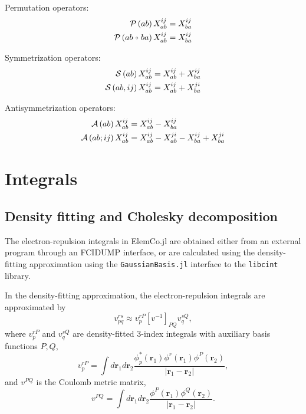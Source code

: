 \documentclass[a4paper,12pt,oneside]{book}
\newcommand{\veryshortarrow}[1][3pt]{\mathrel{%
   \hbox{\rule[\dimexpr\fontdimen22\textfont2-.2pt\relax]{#1}{.4pt}}%
   \mkern-4mu\hbox{\usefont{U}{lasy}{m}{n}\symbol{41}}}}
\newcommand{\vect}{\mathbf}
\newcommand{\perm}[1]{{\cal P}\left(#1\right)}
\newcommand{\Perm}[2]{{\cal P}\left({#1}\veryshortarrow {#2}\right)}
\newcommand{\sop}[1]{{\cal S}\left(#1\right)}
\newcommand{\Sop}[2]{{\cal S}\left(#1,#2\right)}
\newcommand{\asop}[1]{{\cal A}\left(#1\right)}
\newcommand{\ASop}[2]{{\cal A}\left(#1;#2\right)}
\newcommand{\ElemCojl}{\textsf{ElemCo.jl} }
\begin{document}
Permutation operators:
\begin{equation}
\begin{aligned}
\perm{ab} X^{ij}_{ab} &= X^{ij}_{ba} \\
\Perm{ab}{ba} X^{ij}_{ab} &= X^{ij}_{ba} \\
\end{aligned}
\end{equation}

Symmetrization operators:
\begin{equation}
\begin{aligned}
\sop{ab} X^{ij}_{ab} &= X^{ij}_{ab} + X^{ij}_{ba}\\
\Sop{ab}{ij} X^{ij}_{ab} &= X^{ij}_{ab} + X^{ji}_{ba}\\
\end{aligned}
\end{equation}

Antisymmetrization operators:
\begin{equation}
\begin{aligned}
\asop{ab} X^{ij}_{ab} &= X^{ij}_{ab} - X^{ij}_{ba}\\
\ASop{ab}{ij} X^{ij}_{ab} &= X^{ij}_{ab} - X^{ji}_{ab} - X^{ij}_{ba} + X^{ji}_{ba}\\
\end{aligned}
\end{equation}


\chapter{Integrals}
\section{Density fitting and Cholesky decomposition}
\label{sec:df}
The electron-repulsion integrals in \ElemCojl are obtained either from an external program 
through an FCIDUMP \cite{knowlesDeterminant1989} interface, 
or are calculated using the density-fitting approximation using the \texttt{GaussianBasis.jl} 
interface\cite{aroeiraFermi2022} to the \texttt{libcint}\cite{libcint} library.

In the density-fitting approximation, the electron-repulsion integrals are approximated by
\begin{equation}
  v_{pq}^{rs} \approx v_{p}^{rP} \left[v^{-1}\right]_{PQ} v_{q}^{sQ},
\end{equation}
where $v_{p}^{rP}$ and $v_{q}^{sQ}$ are density-fitted 3-index integrals with auxiliary 
basis functions $P,Q$, 
\begin{equation}
v_{p}^{rP} = \int d\vect{r}_1 d\vect{r}_2 \frac{\phi^*_p(\vect{r}_1) \phi^r(\vect{r}_1) \phi^P(\vect{r}_2)}{|\vect{r}_1-\vect{r}_2|},
\end{equation}
and $v^{PQ}$ is the Coulomb metric matrix,
\begin{equation}
  v^{PQ} = \int d\vect{r}_1 d\vect{r}_2 \frac{\phi^P(\vect{r}_1)\phi^Q(\vect{r}_2)}{|\vect{r}_1-\vect{r}_2|}.
\end{equation}
\end{document}
